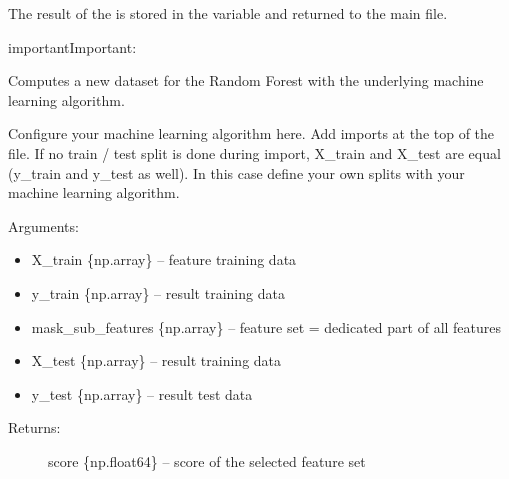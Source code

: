 \documentclass[letterpaper,10pt,english]{sphinxmanual}
\begin{document}
The result of the {\hyperref[\detokenize{Overview:mla}]{}} is stored in the variable  and returned to the main file.

\begin{sphinxadmonition}{important}{Important:}

\begin{fulllineitems}
\label{\detokenize{Generate_Database:ForestFire.compute.compute}}
Computes a new dataset for the Random Forest with the underlying machine learning algorithm.

Configure your machine learning algorithm here.
Add imports at the top of the file.
If no train / test split is done during import, X\_train and X\_test are equal (y\_train and y\_test as well).
In this case define your own splits with your machine learning algorithm.

Arguments:
\begin{itemize}
\item {} 
X\_train \{np.array\} -- feature training data

\item {} 
y\_train \{np.array\} -- result training data

\item {} 
mask\_sub\_features \{np.array\} -- feature set = dedicated part of all features

\item {} 
X\_test \{np.array\} -- result training data

\item {} 
y\_test \{np.array\} -- result test data

\end{itemize}
\begin{description}
\item[{Returns:}] \leavevmode
score \{np.float64\} -- score of the selected feature set

\end{description}

\end{fulllineitems}



\end{sphinxadmonition}
\end{document}
